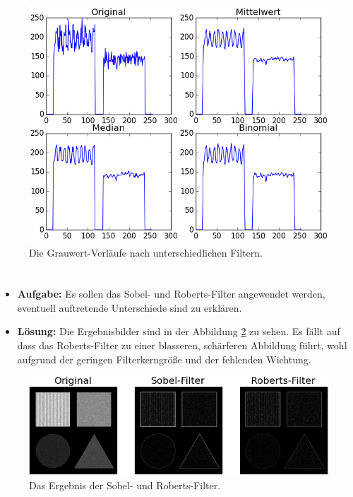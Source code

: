 \documentclass[12pt, a4paper, twoside]{report}
\begin{document}
\begin{figure}
\centering
\includegraphics[width=\textwidth]{../bilder/mmb_profile.png}
\caption{Die Grauwert-Verläufe nach unterschiedlichen Filtern.}
\label{mmb_profil}
\end{figure}

\section{}
\begin{itemize}
\item \textbf{Aufgabe:} Es sollen das Sobel- und Roberts-Filter angewendet werden, eventuell auftretende Unterschiede sind zu erklären.
\item \textbf{Lösung:} Die Ergebnisbilder sind in der Abbildung \ref{sobel} zu sehen. Es fällt auf dass das Roberts-Filter zu einer blasseren, schärferen Abbildung führt, wohl aufgrund der geringen Filterkerngröße und der fehlenden Wichtung.
\end{itemize}

\begin{figure}[h]
\centering
\includegraphics[width=\textwidth]{../bilder/sobel_roberts.png}
\caption{Das Ergebnis der Sobel- und Roberts-Filter.}
\label{sobel}
\end{figure}
\end{document}
